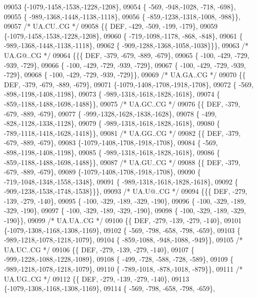 \begin{DoxyCode}
09053 \{-1079,-1458,-1538,-1228,-1208\},
09054 \{ -569, -948,-1028, -718, -698\},
09055 \{ -989,-1368,-1448,-1138,-1118\},
09056 \{ -859,-1238,-1318,-1008, -988\}\},
09057 \textcolor{comment}{/* UA.CU..CG */}
09058 \{\{  DEF, -429, -509, -199, -179\},
09059 \{-1079,-1458,-1538,-1228,-1208\},
09060 \{ -719,-1098,-1178, -868, -848\},
09061 \{ -989,-1368,-1448,-1138,-1118\},
09062 \{ -909,-1288,-1368,-1058,-1038\}\}\},
09063 \textcolor{comment}{/* UA.G@..CG */}
09064 \{\{\{  DEF, -379, -679, -889, -679\},
09065 \{ -100, -429, -729, -939, -729\},
09066 \{ -100, -429, -729, -939, -729\},
09067 \{ -100, -429, -729, -939, -729\},
09068 \{ -100, -429, -729, -939, -729\}\},
09069 \textcolor{comment}{/* UA.GA..CG */}
09070 \{\{  DEF, -379, -679, -889, -679\},
09071 \{-1079,-1408,-1708,-1918,-1708\},
09072 \{ -569, -898,-1198,-1408,-1198\},
09073 \{ -989,-1318,-1618,-1828,-1618\},
09074 \{ -859,-1188,-1488,-1698,-1488\}\},
09075 \textcolor{comment}{/* UA.GC..CG */}
09076 \{\{  DEF, -379, -679, -889, -679\},
09077 \{ -999,-1328,-1628,-1838,-1628\},
09078 \{ -499, -828,-1128,-1338,-1128\},
09079 \{ -989,-1318,-1618,-1828,-1618\},
09080 \{ -789,-1118,-1418,-1628,-1418\}\},
09081 \textcolor{comment}{/* UA.GG..CG */}
09082 \{\{  DEF, -379, -679, -889, -679\},
09083 \{-1079,-1408,-1708,-1918,-1708\},
09084 \{ -569, -898,-1198,-1408,-1198\},
09085 \{ -989,-1318,-1618,-1828,-1618\},
09086 \{ -859,-1188,-1488,-1698,-1488\}\},
09087 \textcolor{comment}{/* UA.GU..CG */}
09088 \{\{  DEF, -379, -679, -889, -679\},
09089 \{-1079,-1408,-1708,-1918,-1708\},
09090 \{ -719,-1048,-1348,-1558,-1348\},
09091 \{ -989,-1318,-1618,-1828,-1618\},
09092 \{ -909,-1238,-1538,-1748,-1538\}\}\},
09093 \textcolor{comment}{/* UA.U@..CG */}
09094 \{\{\{  DEF, -279, -139, -279, -140\},
09095 \{ -100, -329, -189, -329, -190\},
09096 \{ -100, -329, -189, -329, -190\},
09097 \{ -100, -329, -189, -329, -190\},
09098 \{ -100, -329, -189, -329, -190\}\},
09099 \textcolor{comment}{/* UA.UA..CG */}
09100 \{\{  DEF, -279, -139, -279, -140\},
09101 \{-1079,-1308,-1168,-1308,-1169\},
09102 \{ -569, -798, -658, -798, -659\},
09103 \{ -989,-1218,-1078,-1218,-1079\},
09104 \{ -859,-1088, -948,-1088, -949\}\},
09105 \textcolor{comment}{/* UA.UC..CG */}
09106 \{\{  DEF, -279, -139, -279, -140\},
09107 \{ -999,-1228,-1088,-1228,-1089\},
09108 \{ -499, -728, -588, -728, -589\},
09109 \{ -989,-1218,-1078,-1218,-1079\},
09110 \{ -789,-1018, -878,-1018, -879\}\},
09111 \textcolor{comment}{/* UA.UG..CG */}
09112 \{\{  DEF, -279, -139, -279, -140\},
09113 \{-1079,-1308,-1168,-1308,-1169\},
09114 \{ -569, -798, -658, -798, -659\},

\end{DoxyCode}
